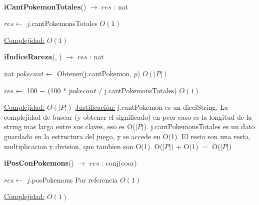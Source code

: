 \begin{Algoritmos}
$ $\newline
$ $\newline



\begin{algorithm}[H]
{\textbf{iCantPokemonTotales}() $\to$ $res$ : nat}
\begin{algorithmic}[1]

\State $res \gets$ $j$.cantPokemonsTotales \Comment $O(1)$

\medskip
\State \underline{Complejidad:} $O(1)$

\end{algorithmic}
\end{algorithm}


\begin{algorithm}[H]
{\textbf{iIndiceRareza}(, ) $\to$ $res$ : nat}
\begin{algorithmic}[1]

\State nat $pokecant \gets$ Obtener(j.cantPokemon, $p$) \Comment $O(|P|)$

\State $res \gets$ 100 $-$ (100 $*$ $pokecant$ $/$ j.cantPokemonsTotales) \Comment $O(1)$

\medskip
\State \underline{Complejidad:} $O(|P|)$
\State \underline{Justificaci\'on:} j.cantPokemon es un dicciString. La complejidad de buscar (y obtener el significado) en peor caso es la longitud de la string mas larga entre sus claves, eso es O($|P|$). j.cantPokemonsTotales es un dato guardado en la estructura del juego, y se accede en O(1). El resto son una resta, multiplicacion y division, que tambien son O(1). O($|P|$) $+$ O(1) $=$ O($|P|$)

\end{algorithmic}
\end{algorithm}




\begin{algorithm}[H]
{\textbf{iPosConPokemons}() $\to$ $res$ : conj(coor)}
\begin{algorithmic}[1]

\State $res \gets$ $j$.posPokemons \Comment Por referencia $O(1)$
 
\medskip
\Statex \underline{Complejidad:} $O(1)$
\end{algorithmic}
\end{algorithm}



\end{Algoritmos}
